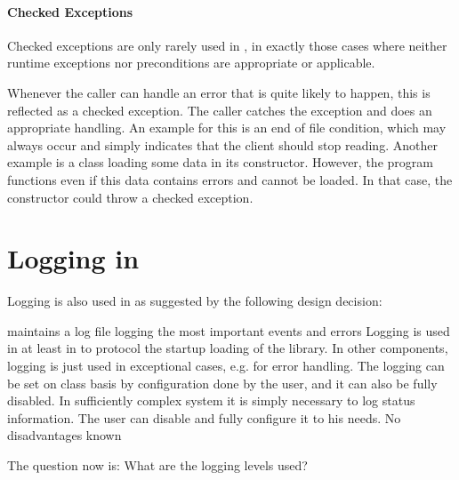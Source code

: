 \paragraph{Checked Exceptions}
\label{sec:CheckedExceptions}

Checked exceptions are only rarely used in \LibName{}, in exactly those cases where neither runtime exceptions nor preconditions are appropriate or applicable.

Whenever the caller can handle an error that is quite likely to happen, this is reflected as a checked exception. The caller catches the exception and does an appropriate handling. An example for this is an end of file condition, which may always occur and simply indicates that the client should stop reading. Another example is a class loading some data in its constructor. However, the program functions even if this data contains errors and cannot be loaded. In that case, the constructor could throw a checked exception.


\section{Logging in \LibName{}}
\label{sec:LoggingLibName}

Logging is also used in \LibName{} as suggested by the following design decision:

{%
\LibName{} maintains a log file logging the most important events and errors
}
{%
Logging is used in \LibName{} at least in \COMPcontext{} to protocol the startup loading of the library. In other components, logging is just used in exceptional cases, e.g. for error handling. The logging can be set on class basis by configuration done by the user, and it can also be fully disabled.
}
{%
In sufficiently complex system it is simply necessary to log status information. The user can disable and fully configure it to his needs. 
}
{%
No disadvantages known
}

The question now is: What are the logging levels used?

